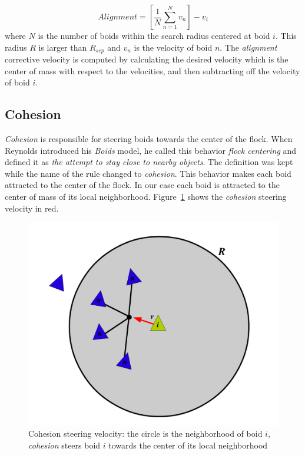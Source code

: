 \begin{equation}
\label{alignmentEquation}
Alignment = \left[  \frac{1}{N} \sum_{n=1}^{N} v_n \right ] - v_i
\end{equation}
where $N$ is the number of boids within the search radius centered at boid $i$. This radius $R$ is larger than $R_{sep}$ and $v_n$ is the velocity of boid $n$. The \textit{alignment} corrective velocity is computed by calculating the desired velocity which is the center of mass with respect to the velocities, and then subtracting off the velocity of boid $i$.

\subsection{Cohesion}
\textit{Cohesion} is responsible for steering boids towards the center of the flock. When Reynolds introduced his \textit{Boids} model, he called this behavior \textit{flock centering} and defined it as \textit{the attempt to stay close to nearby objects}. The definition was kept while the name of the rule changed to \textit{cohesion}. This behavior makes each boid attracted to the center of the flock. In our case each boid is attracted to the center of mass of its local neighborhood. Figure~\ref{cohesionPDF} shows the \textit{cohesion} steering velocity in red.

\begin{figure}[htbp]
\begin{center}
\includegraphics[scale=0.6]{figures/cohesion.pdf}
\caption{Cohesion steering velocity: the circle is the neighborhood of boid $i$, \textit{cohesion} steers boid $i$ towards the center of its local neighborhood}
\label{cohesionPDF}
\end{center}
\end{figure}

